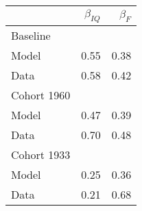 \begin{tabular}{lrr}
\hline
  & $\beta_{IQ}$  & $\beta_{F}$  \\ 
\hline
Baseline &   &   \\ 
Model & 0.55  & 0.38  \\ 
Data & 0.58  & 0.42  \\ 
Cohort 1960 &   &   \\ 
Model & 0.47  & 0.39  \\ 
Data & 0.70  & 0.48  \\ 
Cohort 1933 &   &   \\ 
Model & 0.25  & 0.36  \\ 
Data & 0.21  & 0.68  \\ 
\hline
\end{tabular}%
